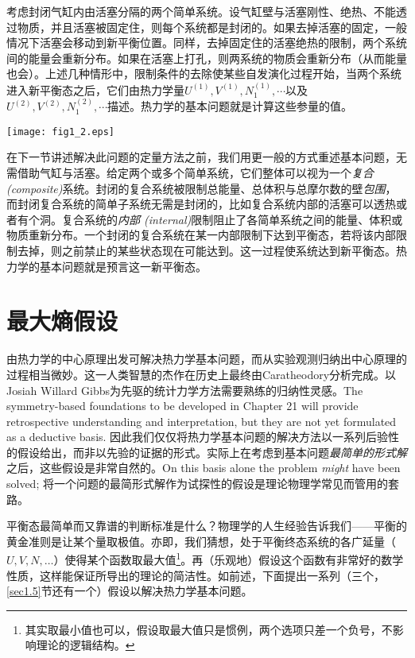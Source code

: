 考虑封闭气缸内由活塞分隔的两个简单系统。设气缸壁与活塞刚性、绝热、不能透过物质，并且活塞被固定住，则每个系统都是封闭的。如果去掉活塞的固定，一般情况下活塞会移动到新平衡位置。同样，去掉固定住的活塞绝热的限制，两个系统间的能量会重新分布。如果在活塞上打孔，则两系统的物质会重新分布（从而能量也会）。上述几种情形中，限制条件的去除使某些自发演化过程开始，当两个系统进入新平衡态之后，它们由热力学量$U^{(1)}, V^{(1)}, N_1^{(1)}, \cdots$以及$U^{(2)}, V^{(2)}, N_1^{(2)}, \cdots$描述。热力学的基本问题就是计算这些参量的值。

{{
	\centering
	\texttt{[image: fig1\_2.eps]}
	\figcaption{}
}}

在下一节讲述解决此问题的定量方法之前，我们用更一般的方式重述基本问题，无需借助气缸与活塞。给定两个或多个简单系统，它们整体可以视为一个{\it 复合 (composite)}系统。封闭的复合系统被限制总能量、总体积与总摩尔数的壁{\it 包围}，而封闭复合系统的简单子系统无需是封闭的，比如复合系统内部的活塞可以透热或者有个洞。复合系统的{\it 内部 (internal)}限制阻止了各简单系统之间的能量、体积或物质重新分布。一个封闭的复合系统在某一内部限制下达到平衡态，若将该内部限制去掉，则之前禁止的某些状态现在可能达到。这一过程使系统达到新平衡态。热力学的基本问题就是预言这一新平衡态。

\section{最大熵假设}
\label{sec1.10}
由热力学的中心原理出发可解决热力学基本问题，而从实验观测归纳出中心原理的过程相当微妙。这一人类智慧的杰作在历史上最终由Caratheodory分析完成。以Josiah Willard Gibbs为先驱的统计力学方法需要熟练的归纳性灵感。The symmetry-based foundations to be developed in Chapter 21 will provide retrospective understanding and interpretation, but they are not yet formulated as a deductive basis. 
因此我们仅仅将热力学基本问题的解决方法以一系列后验性的假设给出，而非以先验的证据的形式。实际上在考虑到基本问题{\it 最简单的形式解}之后，这些假设是非常自然的。On this basis alone the problem {\it might} have been solved; 将一个问题的最简形式解作为试探性的假设是理论物理学常见而管用的套路。

平衡态最简单而又靠谱的判断标准是什么？物理学的人生经验告诉我们——平衡的黄金准则是让某个量取极值。亦即，我们猜想，处于平衡终态系统的各广延量（$U, V, N, \dots$）使得某个函数取最大值\footnote{其实取最小值也可以，假设取最大值只是惯例，两个选项只差一个负号，不影响理论的逻辑结构。}。再（乐观地）假设这个函数有非常好的数学性质，这样能保证所导出的理论的简洁性。如前述，下面提出一系列（三个，\ref{sec1.5}节还有一个）假设以解决热力学基本问题。

